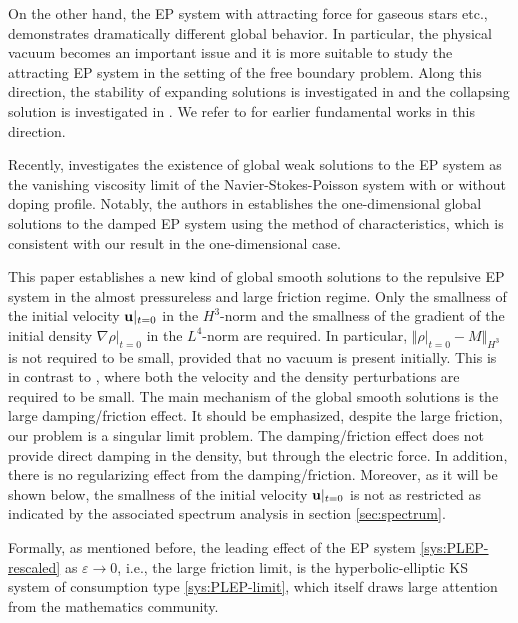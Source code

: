 \documentclass[11pt]{article}
\theoremstyle{plain}
\theoremstyle{definition}
\theoremstyle{remark}
\renewcommand{\vec}[1]{{\bf #1}}
\newcommand{\norm}[2]{\Vert #1 \Vert_{#2}}
\numberwithin{equation}{section}
\begin{document}
    On the other hand, the EP system with attracting force for gaseous stars etc., demonstrates dramatically different global behavior. In particular, the physical vacuum becomes an important issue and it is more suitable to study the attracting EP system in the setting of the free boundary problem. Along this direction, the stability of expanding solutions is investigated in \cite{hadzicClassGlobalSolutions2019} and the collapsing solution is investigated in \cite{guoLarsonPenstonSelfsimilar2021}. We refer to \cite{Jang2009a,Jang2013,Jang2010a,Coutand2010,Coutand2011a,Coutand2012a} for earlier fundamental works in this direction. 

    Recently, \cite{chenGlobalSolutionsCompressible2024,chenGlobalSolutionsCompressible2025,chenGlobalFiniteEnergySolutions2024} investigates the existence of global weak solutions to the EP system as the vanishing viscosity limit of the Navier-Stokes-Poisson system with or without doping profile. Notably, the authors in \cite{choiLargetimeBehaviorPressureless2025} establishes the one-dimensional global solutions to the damped EP system using the method of characteristics, which is consistent with our result in the one-dimensional case. 

    This paper establishes a new kind of global smooth solutions to the repulsive EP system in the almost pressureless and large friction regime. Only the smallness of the initial velocity $\vec u\vert_{t= 0}$ in the $ H^3 $-norm and the smallness of the gradient of the initial density $ \nabla \rho\vert_{t=0} $ in the $ L^4 $-norm are required. In particular, $ \norm{\rho\vert_{t=0} - M}{H^3} $ is not required to be small, provided that no vacuum is present initially. This is in contrast to \cite{guoSmoothIrrotationalFlows1998a,ionescuEulerPoissonSystem2013,guoAbsenceShocksOne2017,liuGlobalSolutionsCompressible2020}, where both the velocity and the density perturbations are required to be small. The main mechanism of the global smooth solutions is the large damping/friction effect. It should be emphasized, despite the large friction, our problem is a singular limit problem. The damping/friction effect does not provide direct damping in the density, but through the electric force. In addition, there is no regularizing effect from the damping/friction. Moreover, as it will be shown below, the smallness of the initial velocity $ \vec u\vert_{t=0} $ is not as restricted as indicated by the associated spectrum analysis in section \ref{sec:spectrum}.

    Formally, as mentioned before, the leading effect of the EP system \eqref{sys:PLEP-rescaled} as $ \varepsilon \rightarrow 0 $, i.e., the large friction limit, is the hyperbolic-elliptic KS system of consumption type \eqref{sys:PLEP-limit}, which itself draws large attention from the mathematics community. 
\end{document}
